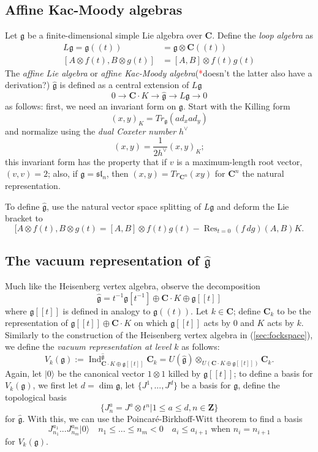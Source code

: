\documentclass{article}
\newcommand{\CC}{\mathbold{C}}
\newcommand{\ZZ}{\mathbold{Z}}
\newcommand{\vac}{|0\rangle}
\newcommand{\gf}{\mathfrak{g}}
\newcommand{\ghat}{\widehat{\mathfrak{g}}}
\newcommand{\tk}{\textcolor{red}{*}}
\DeclareMathOperator{\Res}{Res}
\DeclareMathOperator{\Ind}{Ind}
\begin{document}
\subsection{Affine Kac-Moody algebras}
Let $\gf$ be a finite-dimensional simple Lie algebra over $\CC$.  Define the \textit{loop algebra} as
\begin{align*}
  L\gf=\gf((t))&=\gf \otimes \CC((t))\\
  [A \otimes f(t),B \otimes g(t)]&=[A,B] \otimes f(t)g(t)
\end{align*}
The \textit{affine Lie algebra} or \textit{affine Kac-Moody algebra}(\tk doesn't the latter also have a derivation?) $\ghat$ is defined as a central extension of $L\gf$
\[0 \rightarrow \CC \cdot K \rightarrow \ghat \rightarrow L\gf \rightarrow 0 \]
as follows: first, we need an invariant form on $\gf$.  Start with the Killing form
\[(x,y)_K=Tr_\gf(ad_xad_y) \]
and normalize using the \textit{dual Coxeter number} $h^\vee$
\[(x,y)=\frac{1}{2h^\vee}(x,y)_K; \]
this invariant form has the property that if $v$ is a maximum-length root vector, $(v,v)=2$; also, if $\gf=\mathfrak{sl}_n$, then $(x,y)=Tr_{\CC^n}(xy)$ for $\CC^n$ the natural representation.

To define $\ghat$, use the natural vector space splitting of $L\gf$ and deform the Lie bracket to
\[[A \otimes f(t),B \otimes g(t) = [A,B] \otimes f(t)g(t) - \Res_{t=0}(f\,dg) (A,B)K. \]

\subsection{The vacuum representation of $\ghat$}
Much like the Heisenberg vertex algebra, observe the decomposition
\[\ghat = t^{-1}\gf[t^{-1}] \oplus \CC \cdot K \oplus \gf[[t]] \]
where $\gf[[t]]$ is defined in analogy to $\gf((t))$.  Let $k \in \CC$; define $\CC_k$ to be the representation of $\gf[[t]] \oplus \CC \cdot K$ on which $\gf[[t]]$ acts by $0$ and $K$ acts by $k$.  Similarly to the construction of the Heisenberg vertex algebra in (\ref{sec:fockspace}), we define the \textit{vacuum representation at level $k$} as follows:
\[V_k(\gf):=\Ind_{\CC \cdot K \oplus \gf[[t]]}^{\ghat}\CC_k = U(\ghat) \otimes_{U(\CC \cdot K \oplus \gf[[t]])}\CC_k. \]
Again, let $\vac$ be the canonical vector $1 \otimes 1$ killed by $\gf[[t]]$; to define a basis for $V_k(\gf)$, we first let $d=\dim \gf$, let $\{J^1,...,J^d\}$ be a basis for $\gf$, define the topological basis
\[\{J^a_n=J^a \otimes t^n|1 \le a \le d, n \in \ZZ \} \]
for $\ghat$.  With this, we can use the Poincaré-Birkhoff-Witt theorem to find a basis
\[J^{a_1}_{n_1}...J^{a_m}_{n_m}\vac \quad n_1 \le ... \le n_m < 0 \quad a_i \le a_{i+1} \textrm{ when }n_i=n_{i+1} \]
for $V_k(\gf)$.
\end{document}
